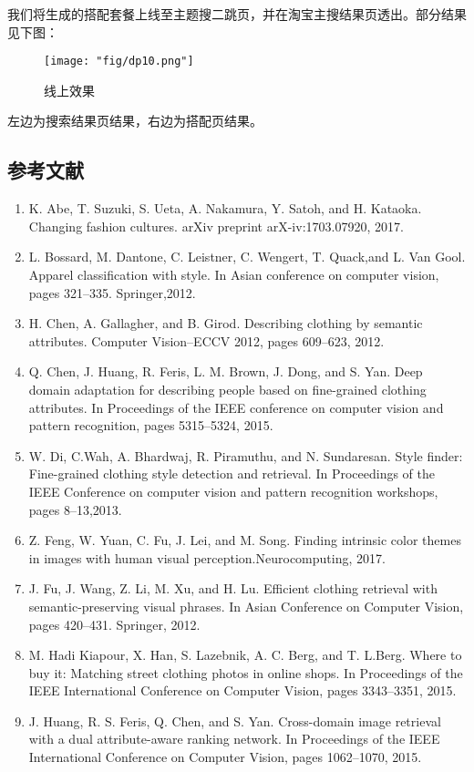 我们将生成的搭配套餐上线至主题搜二跳页，并在淘宝主搜结果页透出。部分结果见下图：
\begin{figure}[!h]
	\centering
	\texttt{[image: "fig/dp10.png"]}
	\caption{线上效果}
	\label{fig:dp10}
\end{figure}

左边为搜索结果页结果，右边为搭配页结果。

\subsection{参考文献}
\begin{enumerate}
\item K. Abe, T. Suzuki, S. Ueta, A. Nakamura, Y. Satoh, and H. Kataoka. Changing fashion cultures. arXiv preprint arX-iv:1703.07920, 2017. 
\item L. Bossard, M. Dantone, C. Leistner, C. Wengert, T. Quack,and L. Van Gool. Apparel classification with style. In Asian conference on computer vision, pages 321–335. Springer,2012.
\item H. Chen, A. Gallagher, and B. Girod. Describing clothing by semantic attributes. Computer Vision–ECCV 2012, pages 609–623, 2012.
\item Q. Chen, J. Huang, R. Feris, L. M. Brown, J. Dong, and S. Yan. Deep domain adaptation for describing people based on fine-grained clothing attributes. In Proceedings of the IEEE conference on computer vision and pattern recognition, pages 5315–5324, 2015.
\item W. Di, C.Wah, A. Bhardwaj, R. Piramuthu, and N. Sundaresan. Style finder: Fine-grained clothing style detection and retrieval. In Proceedings of the IEEE Conference on computer vision and pattern recognition workshops, pages 8–13,2013.
\item Z. Feng, W. Yuan, C. Fu, J. Lei, and M. Song. Finding intrinsic color themes in images with human visual perception.Neurocomputing, 2017.
\item J. Fu, J. Wang, Z. Li, M. Xu, and H. Lu. Efficient clothing retrieval with semantic-preserving visual phrases. In Asian Conference on Computer Vision, pages 420–431. Springer, 2012.
\item M. Hadi Kiapour, X. Han, S. Lazebnik, A. C. Berg, and T. L.Berg. Where to buy it: Matching street clothing photos in online shops. In Proceedings of the IEEE International Conference on Computer Vision, pages 3343–3351, 2015.
\item J. Huang, R. S. Feris, Q. Chen, and S. Yan. Cross-domain image retrieval with a dual attribute-aware ranking network. In Proceedings of the IEEE International Conference on Computer Vision, pages 1062–1070, 2015.

\end{enumerate}
